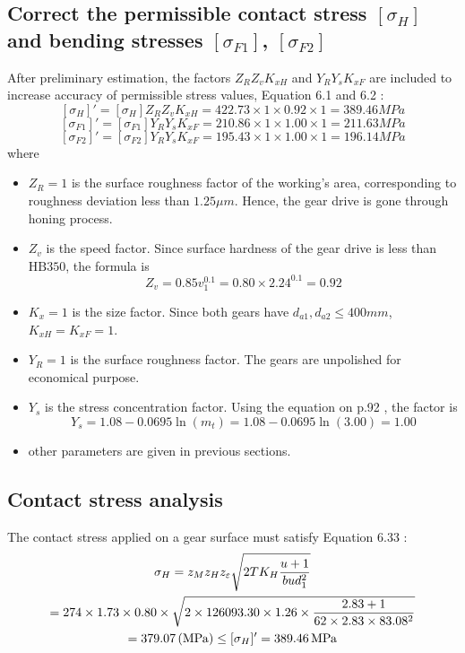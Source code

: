 \subsection{Correct the permissible contact stress $ [\sigma_H] $ and bending stresses $ [\sigma_{F1}] $, $ [\sigma_{F2}] $}
After preliminary estimation, the factors $ Z_RZ_vK_{xH} $ and $ Y_RY_sK_{xF} $ are included to increase accuracy of permissible stress values, Equation 6.1 and 6.2 \cite{tk1}:\\
\[[\sigma_H]'=[\sigma_H]Z_RZ_vK_{xH} = 422.73\times 1\times 0.92\times 1 = 389.46\unit{MPa}\]
\[[\sigma_{F1}]'=[\sigma_{F1}]Y_RY_sK_{xF} = 210.86\times 1\times 1.00\times 1 = 211.63\unit{MPa}\]
\[[\sigma_{F2}]'=[\sigma_{F2}]Y_RY_sK_{xF} = 195.43\times 1\times 1.00\times 1 = 196.14\unit{MPa}\]
where
\begin{itemize}
	\item $ Z_R = 1 $ is the surface roughness factor of the working's area, corresponding to roughness deviation  less than $ 1.25\unit{\mu m} $. Hence, the gear drive is gone through honing process.
	\item $ Z_v $ is the speed factor. Since surface hardness of the gear drive is less than $ \text{HB}350 $, the formula is
	\[ Z_v = 0.85v_1^{0.1} = 0.80\times 2.24^{0.1} = 0.92 \]
	\item $ K_x = 1$ is the size factor. Since both gears have $ d_{a1}, d_{a2} \leq 400\unit{mm} $, $ K_{xH}=K_{xF}=1 $.
	\item $ Y_R=1 $ is the surface roughness factor. The gears are unpolished for economical purpose.
	\item $ Y_s $ is the stress concentration factor. Using the equation on p.92 \cite{tk1}, the factor is
	\[Y_s = 1.08-0.0695\ln(m_t) = 1.08-0.0695\ln(3.00) = 1.00\]
	\item other parameters are given in previous sections.
\end{itemize}

\subsection{Contact stress analysis}

The contact stress applied on a gear surface must satisfy Equation 6.33 \cite{tk1}:
\begin{multline*}
\sigma_H = z_Mz_Hz_\varepsilon\sqrt{2TK_H\dfrac{u+1}{bud_1^2}} \\
= 274\times 1.73 \times 0.80 \times \sqrt{2\times 126093.30 \times 1.26 \times\dfrac{2.83+1}{62 \times 2.83 \times 83.08^2}}\\
= 379.07 \, (\mathrm{MPa}) \leq [\sigma_H]' = 389.46 \, \mathrm{MPa}
\end{multline*}

